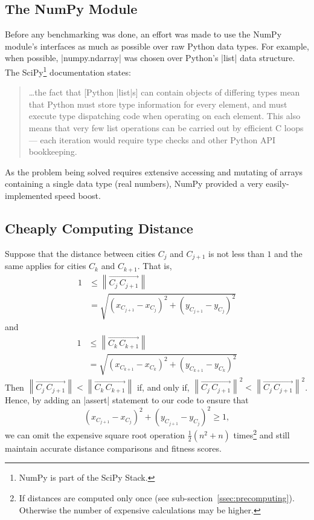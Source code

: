 \subsection{The NumPy Module}
Before any benchmarking was done, an effort was made to use the 
NumPy \cite{numpy} module's interfaces as much as possible over raw 
Python data types. For example, when possible, |numpy.ndarray| was 
chosen over Python's |list| data structure. The SciPy\footnote{NumPy is
part of the SciPy Stack.} documentation states:
\begin{quote}
	 \ldots the fact that [Python |list|s] can contain objects of differing 
	 types mean that Python must store type information for every 
	 element, and must execute type dispatching code when operating 
	 on each element. This also means that very few list operations can 
	 be carried out by efficient C loops --- each iteration would require 
	 type checks and other Python API bookkeeping. \cite{scipy_docs}
\end{quote}
As the problem being solved requires extensive accessing and mutating
of arrays containing a single data type (\ie real numbers), NumPy 
provided a very easily-implemented speed boost.

\subsection{Cheaply Computing Distance}\label{ssec:cheap}
Suppose that the distance between cities $C_j$ and $C_{j+1}$ is not less
 than $1$ and the same applies for cities $C_k$ and $C_{k+1}$. That is, 
\begin{align*}
\textstyle 1 &\leqslant \left\lVert \overrightarrow{C_j \, C_{j+1}} \right\rVert \\
&= \sqrt{(x_{C_{j+1}} - x_{C_j})^2 + (y_{C_{j+1}} - y_{C_j})^2}
\end{align*}
and
\begin{align*}
\textstyle 1 &\leqslant \left\lVert \overrightarrow{C_k\, C_{k+1}} \right\rVert \\
&= \sqrt{(x_{C_{k+1}} - x_{C_k})^2 + (y_{C_{k+1}} - y_{C_k})^2}
\end{align*}
Then 
$\left\lVert \overrightarrow{C_j\, C_{j+1}} \right\rVert < \left\lVert \overrightarrow{C_k\, C_{k+1}} \right\rVert$ 
if, and only if, 
$\left\lVert \overrightarrow{C_j\, C_{j+1}} \right\rVert^2 < \left\lVert \overrightarrow{C_j\, C_{j+1}} \right\rVert^2$.
Hence, by adding an |assert| statement to our code to ensure that 
\begin{equation*}
(x_{C_{j+1}} - x_{C_j})^2 + (y_{C_{j+1}} - y_{C_j})^2 \geqslant 1,
\end{equation*}
we can omit the expensive square root operation $\frac{1}{2}(n^2 + n)$ 
times\footnote{If distances are computed only once (see
sub-section~\ref{ssec:precomputing}). Otherwise the number of expensive
calculations may be higher.} and still maintain accurate distance 
comparisons and fitness scores. 

